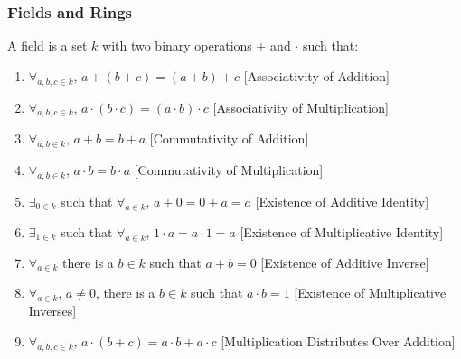             \subsubsection{Fields and Rings}
                \begin{definition}
                    A field is a set $k$ with two binary
                    operations $+$ and $\cdot$ such that:
                    \begin{enumerate}
                        \item $\forall_{a,b,c\in k}$,
                              $a+(b+c)=(a+b)+c$
                              \hfill[Associativity of Addition]
                        \item $\forall_{a,b,c\in k}$,
                              $a\cdot(b\cdot c)=(a\cdot b)\cdot c$
                              \hfill[Associativity of Multiplication]
                        \item $\forall_{a,b\in k}$,
                              $a+b=b+a$
                              \hfill[Commutativity of Addition]
                        \item $\forall_{a,b\in k}$,
                              $a\cdot b=b\cdot a$
                              \hfill[Commutativity of Multiplication]
                        \item $\exists_{0 \in k}$ such that
                              $\forall_{a\in k}$,
                              $a+0=0+a=a$
                              \hfill[Existence of Additive Identity]
                        \item $\exists_{1\in k}$ such that
                              $\forall_{a\in k}$,
                              $1\cdot a=a\cdot 1=a$
                              \hfill[Existence of Multiplicative Identity]
                        \item $\forall_{a\in k}$ there is a
                              $b\in k$ such that $a+b=0$
                              \hfill[Existence of Additive Inverse]
                        \item $\forall_{a\in k}$, $a\ne 0$,
                              there is a $b\in k$ such that
                              $a\cdot b=1$
                              \hfill [Existence of Multiplicative Inverses]
                        \item $\forall_{a,b,c\in k}$,
                              $a\cdot(b+c)=a\cdot b+a\cdot c$
                              \hfill[Multiplication Distributes Over Addition]
                    \end{enumerate}
                \end{definition}
